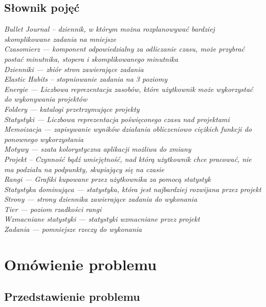 \documentclass[a4paper,11pt]{report}
\begin{document}
\section {Słownik pojęć}
	\emph{Bullet Journal – dziennik, w którym można rozplanowywać bardziej skomplikowane zadania na mniejsze}\\
	\emph{Czasomierz — komponent odpowiedzialny za odliczanie czasu, może przybrać postać minutnika, stopera i skomplikowanego minutnika}\\
	\emph{Dzienniki — zbiór stron zawierające zadania}\\
	\emph{Elastic Habits – stopniowanie zadania na 3 poziomy}\\
	\emph{Energie — Liczbowa reprezentacja zasobów, które użytkownik może wykorzystać do wykonywania projektów}\\
	\emph{Foldery — katalogi przetrzymujące projekty}\\
	\emph{Statystyki — Liczbowa reprezentacja poświęconego czasu nad projektami}\\
	\emph{Memoizacja — zapisywanie wyników działania obliczeniowo ciężkich funkcji do ponownego wykorzystania}\\
	\emph{Motywy — szata kolorystyczna aplikacji możliwa do zmiany}\\
	\emph{Projekt – Czynność bądź umiejętność, nad którą użytkownik chce pracować, nie ma podziału na podpunkty, skupiający się na czasie}\\
	\emph{Rangi — Grafiki kupowane przez użytkownika za pomocą statystyk}\\
	\emph{Statystyka dominująca — statystyka, która jest najbardziej rozwijana przez projekt}\\
	\emph{Strony — strony dziennika zawierające zadania do wykonania}\\
	\emph{Tier — poziom rzadkości rangi}\\
	\emph{Wzmacniane statystyki — statystyki wzmacniane przez projekt}\\
	\emph{Zadania — pomniejsze rzeczy do wykonania}\\
	

\chapter {Omówienie problemu}
\section {Przedstawienie problemu}
\end{document}
